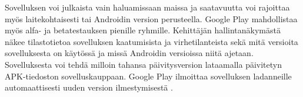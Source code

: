 Sovelluksen voi julkaista vain haluamissaan maissa ja saatavuutta voi rajoittaa myös laitekohtaisesti tai Androidin version perusteella. Google Play mahdollistaa myös alfa- ja betatestauksen pienille ryhmille. Kehittäjän hallintanäkymästä näkee tilastotietoa sovelluksen kaatumisista ja virhetilanteista sekä mitä versioita sovelluksesta on käytössä ja missä Androidin versioissa niitä ajetaan. Sovelluksesta voi tehdä milloin tahansa päivitysversion lataamalla päivitetyn APK-tiedoston sovelluskauppaan. Google Play ilmoittaa sovelluksen ladanneille automaattisesti uuden version ilmestymisestä \cite{publish_android}.